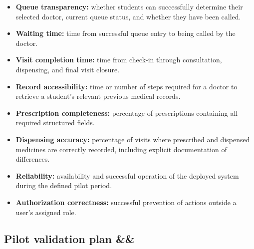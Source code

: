 \documentclass[11pt,a4paper]{article}
\newcommand{\BvrHint}[1]{%
  \ifx&#1&%
  \else
    {\normalfont\normalsize\itshape\hfill #1}%
  \fi}
\begin{document}
\begin{itemize}

    \item \textbf{Queue transparency:} whether students can successfully determine their selected doctor, current queue status, and whether they have been called.

    \item \textbf{Waiting time:} time from successful queue entry to being called by the doctor.

    \item \textbf{Visit completion time:} time from check-in through consultation, dispensing, and final visit closure.

    \item \textbf{Record accessibility:} time or number of steps required for a doctor to retrieve a student's relevant previous medical records.

    \item \textbf{Prescription completeness:} percentage of prescriptions containing all required structured fields.

    \item \textbf{Dispensing accuracy:} percentage of visits where prescribed and dispensed medicines are correctly recorded, including explicit documentation of differences.

    \item \textbf{Reliability:} availability and successful operation of the deployed system during the defined pilot period.

    \item \textbf{Authorization correctness:} successful prevention of actions outside a user's assigned role.

\end{itemize}

\subsection{Pilot validation plan %
\BvrHint{}}
\end{document}
